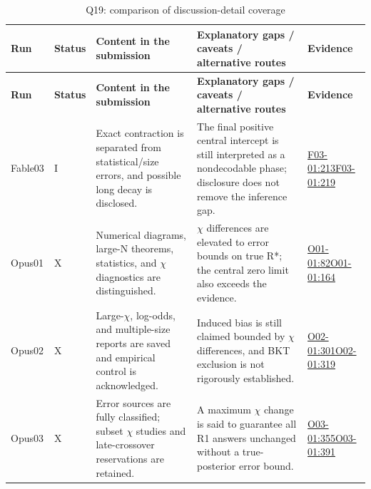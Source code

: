 \documentclass[11pt,a4paper]{article}
\begin{document}
{\fontsize{9.0}{12.6}\selectfont
\setlength{\tabcolsep}{2.5pt}
\begin{longtable}{>{\raggedright\arraybackslash}p{}>{\raggedright\arraybackslash}p{}>{\raggedright\arraybackslash}p{}>{\raggedright\arraybackslash}p{}>{\raggedright\arraybackslash}p{}}
\caption{Q19: comparison of discussion-detail coverage}\\
\toprule
\textbf{Run} & \textbf{Status} & \textbf{Content in the submission} & \textbf{Explanatory gaps /\allowbreak{} caveats /\allowbreak{} alternative routes} & \textbf{Evidence}\tabularnewline
\midrule
\endfirsthead
\toprule
\textbf{Run} & \textbf{Status} & \textbf{Content in the submission} & \textbf{Explanatory gaps /\allowbreak{} caveats /\allowbreak{} alternative routes} & \textbf{Evidence}\tabularnewline
\midrule
\endhead
{}Fable03 & I & Exact contraction is separated from statistical/\allowbreak{}size errors,\allowbreak{} and possible long decay is disclosed. & The final positive central intercept is still interpreted as a nondecodable phase; disclosure does not remove the inference gap. & \hyperref[src:F03-01]{F03-01:213}\newline \hyperref[src:F03-01]{F03-01:219}\tabularnewline
{}Opus01 & X & Numerical diagrams,\allowbreak{} large-N theorems,\allowbreak{} statistics,\allowbreak{} and \ensuremath{\chi} diagnostics are distinguished. & \ensuremath{\chi} differences are elevated to error bounds on true R*; the central zero limit also exceeds the evidence. & \hyperref[src:O01-01]{O01-01:82}\newline \hyperref[src:O01-01]{O01-01:164}\tabularnewline
{}Opus02 & X & Large-\ensuremath{\chi},\allowbreak{} log-odds,\allowbreak{} and multiple-size reports are saved and empirical control is acknowledged. & Induced bias is still claimed bounded by \ensuremath{\chi} differences,\allowbreak{} and BKT exclusion is not rigorously established. & \hyperref[src:O02-01]{O02-01:301}\newline \hyperref[src:O02-01]{O02-01:319}\tabularnewline
{}Opus03 & X & Error sources are fully classified; subset \ensuremath{\chi} studies and late-crossover reservations are retained. & A maximum \ensuremath{\chi} change is said to guarantee all R1 answers unchanged without a true-posterior error bound. & \hyperref[src:O03-01]{O03-01:355}\newline \hyperref[src:O03-01]{O03-01:391}\tabularnewline

\end{longtable}}
\end{document}
